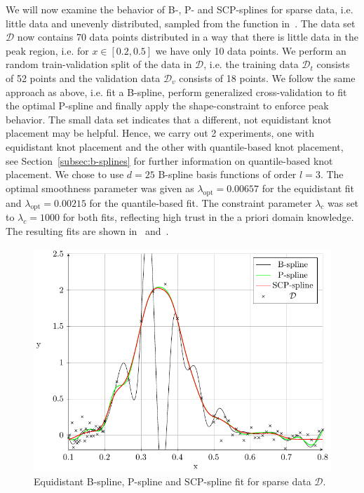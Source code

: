 We will now examine the behavior of B-, P- and SCP-splines for sparse data, i.e. little data and unevenly distributed, sampled from the function in~. The data set $\mathcal{D}$ now contains 70 data points distributed in a way that there is little data in the peak region, i.e. for $x \in [0.2, 0.5]$ we have only 10 data points. We perform an random train-validation split of the data in $\mathcal{D}$, i.e. the training data $\mathcal{D}_t$ consists of 52 points and the validation data $\mathcal{D}_v$ consists of 18 points. We follow the same approach as above, i.e. fit a B-spline, perform generalized cross-validation to fit the optimal P-spline and finally apply the shape-constraint to enforce peak behavior. The small data set indicates that a different, not equidistant knot placement may be helpful. Hence, we carry out 2 experiments, one with equidistant knot placement and the other with quantile-based knot placement, see Section~\ref{subsec:b-splines} for further information on quantile-based knot placement. We chose to use $d=25$ B-spline basis functions of order $l=3$. The optimal smoothness parameter was given as $\lambda_{\mathrm{opt}} = 0.00657$ for the equidistant fit and $\lambda_{\mathrm{opt}} = 0.00215$ for the quantile-based fit. The constraint parameter $\lambda_c$ was set to $\lambda_c=1000$ for both fits, reflecting high trust in the a priori domain knowledge. The resulting fits are shown in~ and~.


\begin{figure}[H]
	\centering
	\includegraphics{graphics/pgfplots/cha4/exp-sparse-equidistant.pdf}
	\caption{Equidistant B-spline, P-spline and SCP-spline fit for sparse data $\mathcal{D}$.}
	\label{fig:sparse-example-equidistant}
\end{figure}

